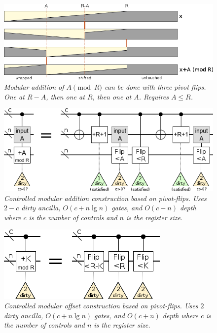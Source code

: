 \documentclass[twocolumn]{article}
\begin{document}
\begin{figure}
  \centering
  \includegraphics[width=\linewidth]{assets/mod-add-from-pivot-flip-bars.png}
  \caption{\em
     Modular addition of $A \pmod{R}$ can be done with three pivot flips.
     One at $R-A$, then one at $R$, then one at $A$.
     Requires $A \leq R$.
   }
  \label{fig:mod-add-from-pivot-flip-bars}
\end{figure}

\begin{figure}
  \centering
  \includegraphics[width=\linewidth]{assets/controlled-modular-addition.png}
  \caption{\em
    Controlled modular addition construction based on pivot-flips.
    Uses $2-c$ dirty ancilla, $O(c + n \lg n)$ gates, and $O(c + n)$ depth where $c$ is the number of controls and $n$ is the register size.
  }
  \label{fig:controlled-modular-add}
\end{figure}

\begin{figure}
  \centering
  \includegraphics[width=\linewidth]{assets/controlled-modular-offset.png}
  \caption{\em
    Controlled modular offset construction based on pivot-flips.
    Uses $2$ dirty ancilla, $O(c + n \lg n)$ gates, and $O(c + n)$ depth where $c$ is the number of controls and $n$ is the register size.
  }
  \label{fig:controlled-modular-offset}
\end{figure}
\end{document}
